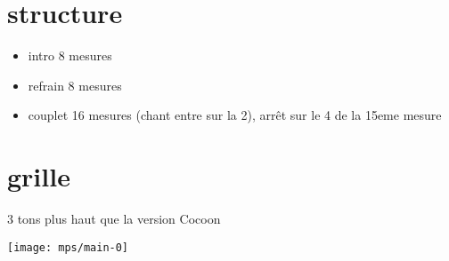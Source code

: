 \documentclass[11pt]{article}
\begin{document}
    \makesongtitle


    \section{structure}

    \begin{itemize}[noitemsep]
        \item     intro 8 mesures
        \item     refrain 8 mesures
        \item     couplet 16 mesures (chant entre sur la 2), arr\^et sur le 4 de la 15eme mesure
    \end{itemize}


    \section{grille}

    3  \textonehalf{}  tons plus haut que la version Cocoon

    \texttt{[image: mps/main-0]}

    




%    


%    
\end{document}
